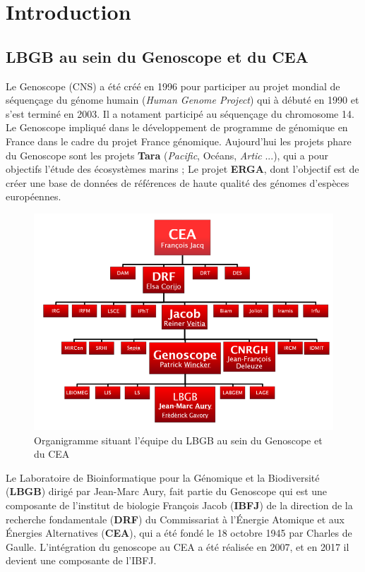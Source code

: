 \section{Introduction}
\subsection{LBGB au sein du Genoscope et du CEA}
Le Genoscope (CNS) a été créé en 1996 pour participer au projet mondial de séquençage du génome humain (\emph{Human Genome Project}) qui à débuté en 1990 et s'est terminé en 2003. Il a notament participé au séquençage du chromosome 14. Le Genoscope impliqué dans le développement de programme de génomique en France dans le cadre du projet France génomique. Aujourd'hui les projets phare du Genoscope sont les projets \textbf{Tara} (\emph{Pacific}, Océans, \emph{Artic} ...), qui a pour objectifs l'étude des écosystèmes marins ; Le projet \textbf{ERGA}, dont l'objectif est de créer une base de données de références de haute qualité des génomes d'espèces européennes.\\

\begin{minipage}{0.40\textwidth}
\begin{figure}[H]
    \centering
    \includegraphics[width=1\textwidth]{img/organigramme.png}
    \caption{Organigramme situant l’équipe du LBGB au sein du Genoscope et du CEA}
    \label{organigramme_LBGB}
\end{figure}
\end{minipage} 
\hfill
\begin{minipage}{0.5\textwidth}
    Le Laboratoire de Bioinformatique pour la Génomique et la Biodiversité (\textbf{LBGB}) dirigé par Jean-Marc Aury, fait partie du Genoscope qui est une composante de l'institut de biologie François Jacob (\textbf{IBFJ}) de la direction de la recherche fondamentale (\textbf{DRF}) du Commissariat à l'Énergie Atomique et aux Énergies Alternatives (\textbf{CEA}), qui a été fondé le 18 octobre 1945 par Charles de Gaulle. L'intégration du genoscope au CEA a été réalisée en 2007, et en 2017 il devient une composante de l'IBFJ.
\end{minipage}

